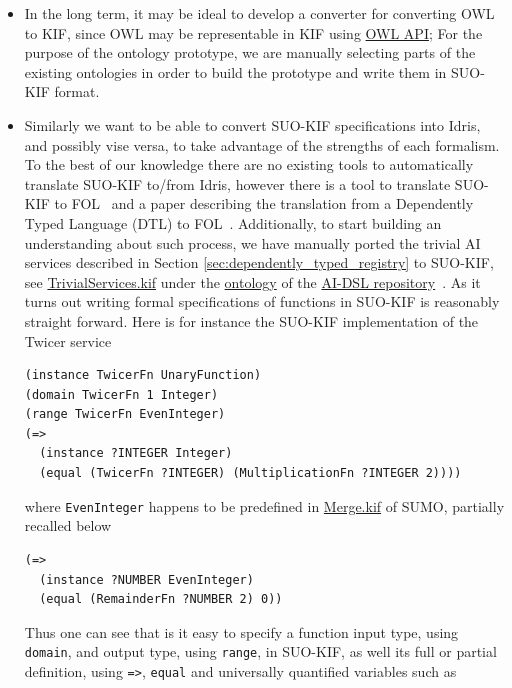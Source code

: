 \documentclass[]{report}
\begin{document}
\begin{itemize}
  \item In the long term, it may be ideal to develop a converter for converting
OWL to KIF, since OWL may be representable in KIF
\cite{martin_translations_nodate}  using \href{https://github.com/owlcs/owlapi}{OWL
	API}; For the purpose of the ontology
prototype, we are manually selecting parts of the existing ontologies in order to build
the prototype and write them in SUO-KIF format.
  \item Similarly we want to be able to convert SUO-KIF specifications
    into Idris, and possibly vise versa, to take advantage of the strengths of
    each formalism.  To the best of our knowledge there are no existing
    tools to automatically translate SUO-KIF to/from Idris, however
    there is a tool to translate SUO-KIF to
    FOL~\cite{Pease_firstorder} and a paper describing
    the translation from a Dependently Typed Language (DTL) to
    FOL~\cite{SojakovaKristina2009}.  Additionally, to start building
    an understanding about such process, we have manually ported the trivial AI
    services described in Section \ref{sec:dependently_typed_registry} to SUO-KIF, see
    \href{https://github.com/singnet/ai-dsl/blob/master/ontology/TrivialServices.kif}{TrivialServices.kif}
    under the
    \href{https://github.com/singnet/ai-dsl/blob/master/ontology}{ontology}
    of the \href{https://github.com/singnet/ai-dsl/}{AI-DSL
      repository}~\cite{AIDSLRepo}.  As it turns out writing formal
    specifications of functions in SUO-KIF is reasonably straight
    forward.  Here is for instance the SUO-KIF implementation of the Twicer service
\begin{verbatim}
(instance TwicerFn UnaryFunction)
(domain TwicerFn 1 Integer)
(range TwicerFn EvenInteger)
(=>
  (instance ?INTEGER Integer)
  (equal (TwicerFn ?INTEGER) (MultiplicationFn ?INTEGER 2))))
\end{verbatim}
where \texttt{EvenInteger} happens to be predefined in
\href{https://github.com/ontologyportal/sumo/blob/master/Merge.kif}{Merge.kif}
of SUMO, partially recalled below
\begin{verbatim}
(=>
  (instance ?NUMBER EvenInteger)
  (equal (RemainderFn ?NUMBER 2) 0))
\end{verbatim}
Thus one can see that is it easy to specify a function input type,
using \texttt{domain}, and output type, using \texttt{range}, in
SUO-KIF, as well its full or partial definition, using \texttt{=>},
\texttt{equal} and universally quantified variables such as

\end{itemize}
\end{document}
